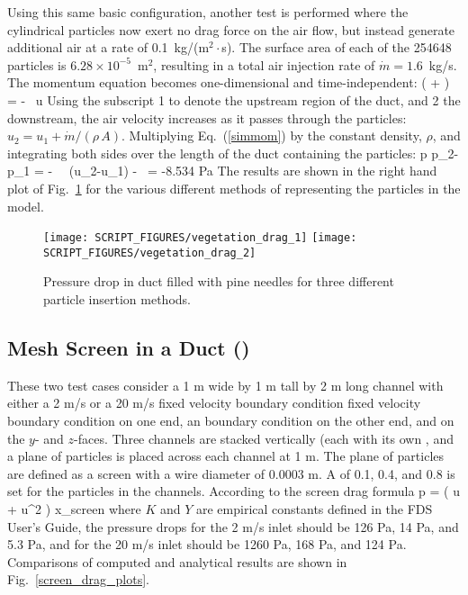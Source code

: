 \documentclass[11pt]{book}
\begin{document}
Using this same basic configuration, another test is performed where the cylindrical particles now exert no drag force on the air flow, but instead generate additional air at a rate of 0.1~kg/(m$^2 \cdot$s). The surface area of each of the 254648 particles is $6.28 \times 10^{-5}$~m$^2$, resulting in a total air injection rate of $\dot{m}=1.6$~kg/s. The momentum equation becomes one-dimensional and time-independent:
\be
    \left(  +  \right) = -   \, u  \label{simmom}
\ee
Using the subscript 1 to denote the upstream region of the duct, and 2 the downstream, the air velocity increases as it passes through the particles: $u_2=u_1+\dot{m}/(\rho \, A)$. Multiplying Eq.~(\ref{simmom}) by the constant density, $\rho$, and integrating both sides over the length of the duct containing the particles:
\be
   \Delta p \equiv p_2-p_1 =  - \rho \,  \, (u_2-u_1) -  \,  = -8.534  \; {\rm Pa}
\ee
The results are shown in the right hand plot of Fig.~\ref{vegetation_drag_fig} for the various different methods of representing the particles in the model.

\begin{figure}[ht]
\texttt{[image: SCRIPT\_FIGURES/vegetation\_drag\_1]}
\texttt{[image: SCRIPT\_FIGURES/vegetation\_drag\_2]}
\caption[The  test cases]{Pressure drop in duct filled with pine needles for three different particle insertion methods.}
\label{vegetation_drag_fig}
\end{figure}



\subsection{Mesh Screen in a Duct (\texorpdfstring{}{screen\_drag})}
\label{screen_drag_1}
\label{screen_drag_2}

These two test cases consider a 1 m wide by 1 m tall by 2 m long channel with either a 2 m/s or a 20 m/s fixed velocity boundary condition fixed velocity boundary condition on one end, an  boundary condition on the other end, and  on the $y$- and $z$-faces.  Three channels are stacked vertically (each with its own , and a plane of particles is placed across each channel at 1 m.  The plane of particles are defined as a screen with a wire diameter of 0.0003 m.  A  of 0.1, 0.4, and 0.8 is set for the particles in the channels.  According to the screen drag formula
\be
   \Delta p \;= \; \left(  u \; + \; \rho {} u^2 \right) \Delta x_{\rm screen}
\ee
where $K$ and $Y$ are empirical constants defined in the FDS User's Guide, the pressure drops for the 2 m/s inlet should be 126 Pa, 14 Pa, and 5.3 Pa, and for the 20 m/s inlet should be 1260 Pa, 168 Pa, and 124 Pa.   Comparisons of computed and analytical results are shown in Fig.~\ref{screen_drag_plots}.
\end{document}
